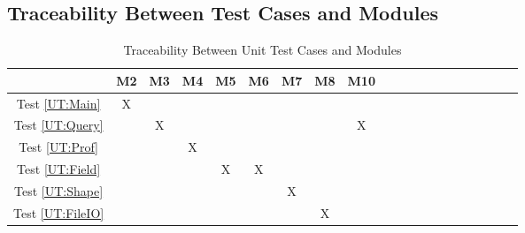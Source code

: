 \documentclass[12pt, titlepage]{article}
\begin{document}
					
					
					
					

					
					
					
					




\subsection{Traceability Between Test Cases and Modules}


\begin{table}[h!]
  \centering
  \begin{tabular}{|c|c|c|c|c|c|c|c|c|c|c|c|c|c|c|c|c|c|c|c|}
  \hline
                            & M2 & M3 & M4 & M5 & M6 & M7 & M8 & M10 \\
  \hline
  Test \ref{UT:Main}        & X  &    &    &    &    &    &    &     \\\hline
  Test \ref{UT:Query}       &    & X  &    &    &    &    &    & X   \\\hline
  Test \ref{UT:Prof}        &    &    & X  &    &    &    &    &     \\\hline
  Test \ref{UT:Field}       &    &    &    & X  & X  &    &    &     \\\hline
  Test \ref{UT:Shape}       &    &    &    &    &    & X  &    &     \\\hline
  Test \ref{UT:FileIO}      &    &    &    &    &    &    & X  &     \\\hline
  \end{tabular}
  \caption{Traceability Between Unit Test Cases and Modules}
  \label{Table:A_trace}
\end{table}
				
\end{document}
